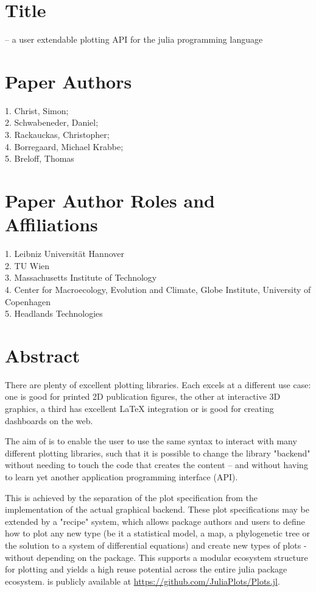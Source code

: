 \vspace{0.5cm}

\section*{Title}

\Plots -- a user extendable plotting API for the julia programming language

\section*{Paper Authors}

1. Christ, Simon; \\
2. Schwabeneder, Daniel; \\
3. Rackauckas, Christopher; \\
4. Borregaard, Michael Krabbe; \\
5. Breloff, Thomas

\section*{Paper Author Roles and Affiliations}
1. Leibniz Universit\"at Hannover\\
2. TU Wien \\
3. Massachusetts Institute of Technology \\
4. Center for Macroecology, Evolution and Climate, Globe Institute, University of Copenhagen \\
5. Headlands Technologies

\section*{Abstract}


There are plenty of excellent plotting libraries.
Each excels at a different use case: one is good for printed 2D publication figures, the other at interactive 3D graphics, a third has excellent \LaTeX{} integration or is good for creating dashboards on the web.

The aim of \Plots is to enable the user to use the same syntax to interact with many different plotting libraries, such that it is possible to change the library "backend" without needing to touch the code that creates the content – and without having to learn yet another application programming interface (API).

This is achieved by the separation of the plot specification from the implementation of the actual graphical backend.
These plot specifications may be extended by a "recipe" system, which allows package authors and users to define how to plot any new type (be it a statistical model, a map, a phylogenetic tree or the solution to a system of differential equations) and create new types of plots - without depending on the \Plots package.
This supports a modular ecosystem structure for plotting and yields a high reuse potential across the entire julia package ecosystem.
\Plots is publicly available at \url{https://github.com/JuliaPlots/Plots.jl}.

